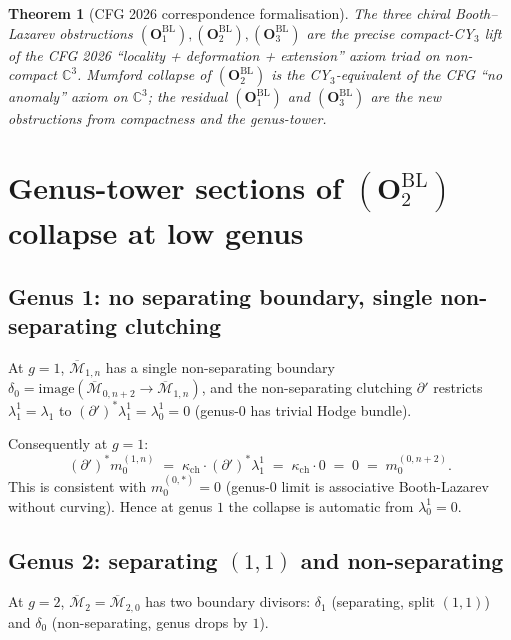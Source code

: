 \documentclass[11pt]{amsart}
\newtheorem{theorem}{Theorem}[section]
\newcommand{\kch}{\kappa_{\mathrm{ch}}}
\newcommand{\Mbar}{\overline{\mathcal{M}}}
\newcommand{\bC}{\mathbb{C}}
\begin{document}
\begin{theorem}[CFG 2026 correspondence formalisation]
\label{thm:cfg-correspondence}
The three chiral Booth--Lazarev obstructions
$(\mathbf{O}_1^{\mathrm{BL}}), (\mathbf{O}_2^{\mathrm{BL}}),
(\mathbf{O}_3^{\mathrm{BL}})$ are the precise compact-CY$_3$
lift of the CFG 2026 ``locality + deformation + extension'' axiom
triad on non-compact $\bC^3$. Mumford collapse of
$(\mathbf{O}_2^{\mathrm{BL}})$ is the CY$_3$-equivalent of the
CFG ``no anomaly'' axiom on $\bC^3$; the residual
$(\mathbf{O}_1^{\mathrm{BL}})$ and $(\mathbf{O}_3^{\mathrm{BL}})$
are the new obstructions from compactness and the genus-tower.
\end{theorem}

\section{Genus-tower sections of $(\mathbf{O}_2^{\mathrm{BL}})$
collapse at low genus}
\label{sec:low-genus-sections}

\subsection{Genus 1: no separating boundary, single
non-separating clutching}

At $g = 1$, $\Mbar_{1, n}$ has a single non-separating boundary
$\delta_0 = \mathrm{image}(\Mbar_{0, n+2} \to \Mbar_{1, n})$, and
the non-separating clutching $\partial'$ restricts
$\lambda_1^1 = \lambda_1$ to $(\partial')^* \lambda_1^1 =
\lambda_0^1 = 0$ (genus-$0$ has trivial Hodge bundle).

Consequently at $g = 1$:
\[
(\partial')^* m_0^{(1, n)} \;=\; \kch \cdot (\partial')^* \lambda_1^1 \;=\;
\kch \cdot 0 \;=\; 0 \;=\; m_0^{(0, n+2)}.
\]
This is consistent with $m_0^{(0, *)} = 0$ (genus-$0$ limit is
associative Booth-Lazarev without curving). Hence at genus $1$ the
collapse is automatic from $\lambda_0^1 = 0$.

\subsection{Genus 2: separating $(1, 1)$ and non-separating}

At $g = 2$, $\Mbar_2 = \Mbar_{2, 0}$ has two boundary divisors:
$\delta_1$ (separating, split $(1, 1)$) and $\delta_0$
(non-separating, genus drops by $1$).
\end{document}
